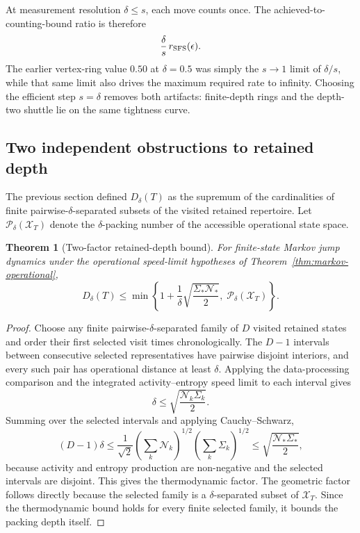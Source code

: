 \documentclass[11pt,a4paper]{article}
\newtheorem{theorem}{Theorem}[section]
\theoremstyle{definition}
\numberwithin{equation}{section}
\begin{document}
At measurement resolution $\delta\le s$, each move counts once. The
achieved-to-counting-bound ratio is therefore
\[
\frac{\delta}{s}\,r_{\rm SFS}(\epsilon).
\]
The earlier vertex-ring value $0.50$ at $\delta=0.5$ was simply the
$s\to1$ limit of $\delta/s$, while that same limit also drives the maximum
required rate to infinity. Choosing the efficient step $s=\delta$ removes both
artifacts: finite-depth rings and the depth-two shuttle lie on the same
tightness curve.

\subsection*{Two independent obstructions to retained depth}

The previous section defined $D_\delta(T)$ as the supremum of the cardinalities
of finite pairwise-$\delta$-separated subsets of the visited retained
repertoire. Let $\mathcal P_\delta(\mathcal X_T)$ denote the
$\delta$-packing number of the accessible operational state space.

\begin{theorem}[Two-factor retained-depth bound]
\label{thm:twofactor-depth}
For finite-state Markov jump dynamics under the operational speed-limit
hypotheses of Theorem~\ref{thm:markov-operational},
\begin{equation}
\boxed{
D_\delta(T)
\le
\min\left\{
1+\frac1\delta
\sqrt{\frac{\Sigma_*\mathcal N_*}{2}},
\;
\mathcal P_\delta(\mathcal X_T)
\right\}.
}
\label{eq:combined-depth}
\end{equation}
\end{theorem}

\begin{proof}
Choose any finite pairwise-$\delta$-separated family of $D$ visited retained
states and order their first selected visit times chronologically. The
$D-1$ intervals between consecutive selected representatives have pairwise
disjoint interiors, and every such pair has operational distance at least
$\delta$. Applying the data-processing comparison and the integrated
activity--entropy speed limit to each interval gives
\[
\delta
\le
\sqrt{\frac{\mathcal N_k\Sigma_k}{2}}.
\]
Summing over the selected intervals and applying Cauchy--Schwarz,
\[
(D-1)\delta
\le
\frac1{\sqrt2}
\left(\sum_k\mathcal N_k\right)^{1/2}
\left(\sum_k\Sigma_k\right)^{1/2}
\le
\sqrt{\frac{\mathcal N_*\Sigma_*}{2}},
\]
because activity and entropy production are non-negative and the selected
intervals are disjoint. This gives the thermodynamic factor. The geometric
factor follows directly because the selected family is a
$\delta$-separated subset of $\mathcal X_T$. Since the thermodynamic bound
holds for every finite selected family, it bounds the packing depth itself.
\end{proof}
\end{document}
